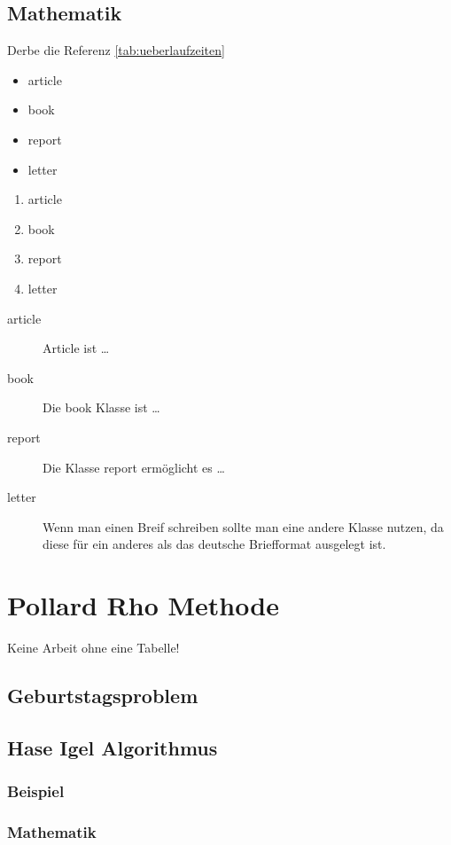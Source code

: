 \documentclass[12pt, a4paper, titlepage,twoside]{article}
\begin{document}
	\subsection{Mathematik}
	Derbe die Referenz \ref{tab:ueberlaufzeiten}
	\begin{itemize}
	
		\item article
		\item book 
		\item report 
		\item letter 
	\end{itemize}
	
	
	\begin{enumerate}
		\item article
		\item book 
		\item report 
		\item letter 
	\end{enumerate}
	
	\begin{description}
		\item[article\label{article}]{Article ist \ldots}
		\item[book\label{book}]{Die book Klasse ist \ldots}
		\item[report\label{report}]{Die Klasse report erm\"oglicht es \ldots}
		\item[letter\label{letter}]{Wenn man einen Breif schreiben sollte man eine
			andere Klasse nutzen, da diese f\"ur ein anderes als das deutsche
			Briefformat ausgelegt ist.}
	\end{description}
	
	\section{Pollard Rho Methode}
	Keine Arbeit ohne eine Tabelle!
		\subsection{Geburtstagsproblem}
		\subsection{Hase Igel Algorithmus}
			\subsubsection{Beispiel}
			\subsubsection{Mathematik}
\end{document}
